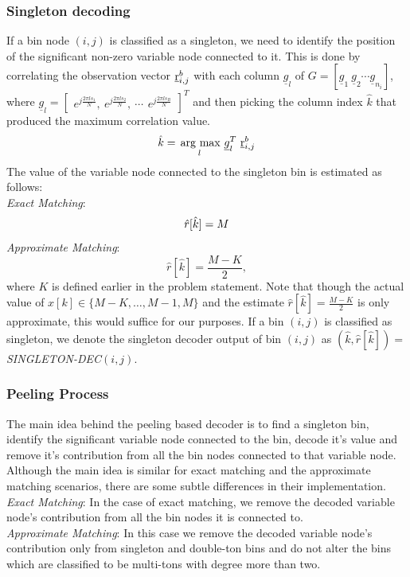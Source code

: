 \begin{enumerate}
\subsubsection{Singleton decoding}
 If a bin node $(i,j)$ is classified as a singleton, we need to identify the position of the significant non-zero variable node connected to it. This is done by correlating the observation vector $\underline{\mathrm{r}}^{b}_{i,j}$ with each column $\underline{g}_l$ of  $G = [\underline{g}_1 \ \underline{g}_2 \cdots \underline{g}_{n_i}]$, where $\underline{g}_l =\begin{bmatrix}
			 e^{j \frac{2\pi l s_1}{N}}, ~ e^{j \frac{2\pi l s_2}{N}}, ~ \cdots\, ~ e^{j \frac{2\pi l s_B}{N}}
			 \end{bmatrix}^{T}$ and then picking the column index $\hat{k}$ that produced the maximum correlation value.
\begin{align*}
 \hat{k} = \underset{l}{\operatorname*{\,arg\ max}}\  \underline{g}^T_l ~ \underline{\mathrm{r}}^{b}_{i,j}
\end{align*}
 The value of the variable node connected to  the singleton bin  is estimated as follows:\\
 \textit{Exact Matching}: 
 $$\hat{r}[\hat{k}]=M\\
 $$
 \textit{Approximate Matching}: 
 $$
 \hat{r}[\hat{k}]=\frac{M-K}{2},
 $$
 where $K$ is defined earlier in the problem statement. Note that though the actual value of $x[k]\in\{M-K,\ldots,M-1,M\}$ and the estimate $ \hat{r}[\hat{k}]=\frac{M-K}{2}$ is only approximate, this would suffice for our purposes. If a bin $(i,j)$ is classified as singleton, we denote the singleton decoder output of bin $(i,j)$ as $(\hat{k},\hat{r}[\hat{k}])=${\it SINGLETON-DEC}$(i,j)$.\\ %
			 
\subsubsection{Peeling Process} The main idea behind the peeling based decoder is to find a singleton bin, identify the significant variable node connected to the bin, decode it's value and remove it's contribution from all the bin nodes connected to that variable node. Although the main idea is similar for exact matching and the approximate matching scenarios, there are some subtle differences in their implementation.\\
{\it Exact Matching}: In the case of exact matching, we remove the decoded variable node's contribution from all the bin nodes it is connected to.\\
{\it Approximate Matching}: In this case we remove the decoded variable node's contribution only from singleton and double-ton bins and do not alter the bins which are classified to be multi-tons with degree more than two.\\


\end{enumerate}
